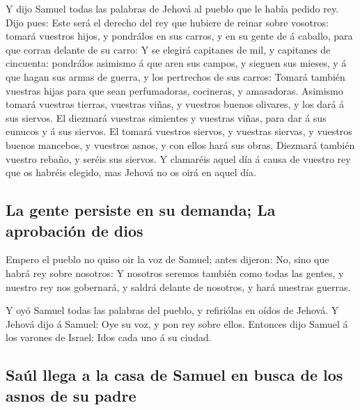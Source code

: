  Y dijo Samuel todas las palabras de Jehová al pueblo que
le había pedido rey.  Dijo pues: Este será el derecho del
rey que hubiere de reinar sobre vosotros: tomará vuestros hijos, y
pondrálos en sus carros, y en su gente de á caballo, para que corran
delante de su carro:  Y se elegirá capitanes de mil, y
capitanes de cincuenta: pondrálos asimismo á que aren sus campos, y
sieguen sus mieses, y á que hagan sus armas de guerra, y los pertrechos
de sus carros:  Tomará también vuestras hijas para que sean
perfumadoras, cocineras, y amasadoras.  Asimismo tomará
vuestras tierras, vuestras viñas, y vuestros buenos olivares, y los dará
á sus siervos.  El diezmará vuestras simientes y vuestras
viñas, para dar á sus eunucos y á sus siervos.  El tomará
vuestros siervos, y vuestras siervas, y vuestros buenos mancebos, y
vuestros asnos, y con ellos hará sus obras.  Diezmará
también vuestro rebaño, y seréis sus siervos.  Y clamaréis
aquel día á causa de vuestro rey que os habréis elegido, mas Jehová no
os oirá en aquel día.

\hypertarget{la-gente-persiste-en-su-demanda-la-aprobaciuxf3n-de-dios}{%
\subsection{La gente persiste en su demanda; La aprobación de
dios}\label{la-gente-persiste-en-su-demanda-la-aprobaciuxf3n-de-dios}}

 Empero el pueblo no quiso oir la voz de Samuel; antes
dijeron: No, sino que habrá rey sobre nosotros:  Y nosotros
seremos también como todas las gentes, y nuestro rey nos gobernará, y
saldrá delante de nosotros, y hará nuestras guerras.

 Y oyó Samuel todas las palabras del pueblo, y refiriólas
en oídos de Jehová.  Y Jehová dijo á Samuel: Oye su voz, y
pon rey sobre ellos. Entonces dijo Samuel á los varones de Israel: Idos
cada uno á su ciudad.

\hypertarget{sauxfal-llega-a-la-casa-de-samuel-en-busca-de-los-asnos-de-su-padre}{%
\subsection{Saúl llega a la casa de Samuel en busca de los asnos de su
padre}\label{sauxfal-llega-a-la-casa-de-samuel-en-busca-de-los-asnos-de-su-padre}}

